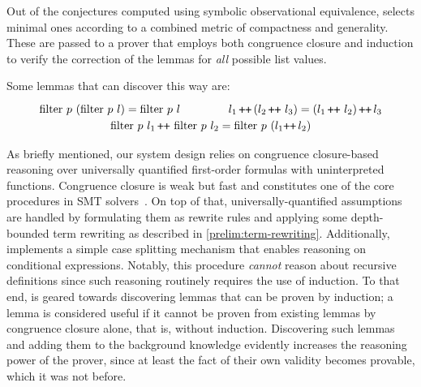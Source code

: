 Out of the conjectures computed using symbolic observational equivalence, \TheSy selects minimal ones according to a combined metric of compactness and generality.
These are passed to a prover that employs both congruence closure and induction to verify the correction of the lemmas for \emph{all} possible list values.

Some lemmas that \TheSy can discover this way are:
\[
\renewcommand\arraystretch{1.2}
\begin{array}{c}
\tfilter~p~(\tfilter~p~l) = \tfilter~p~l
 \hspace{1.5cm}
l_1 \,{\concat}\, (l_2 \,{\concat}~ l_3) = (l_1 \,{\concat}~ l_2) \,{\concat}\, l_3 \\
\tfilter~p~l_1 \concat \,\tfilter~p~l_2 =
\tfilter~p~(l_1{\concat}\,l_2)
\end{array}
\]

As briefly mentioned, our system design relies on congruence closure-based reasoning over universally quantified first-order formulas with uninterpreted functions.
Congruence closure is weak but fast and constitutes one of the core procedures in SMT solvers~\cite{JACM1980:Nelson,IC2007:Nieuwenhuis}.
On top of that, universally-quantified assumptions~\cite{TACAS2017:Barbosa} are handled by formulating them as rewrite rules and applying some depth-bounded term rewriting as described in \autoref{prelim:term-rewriting}.
Additionally, \TheSy implements a simple case splitting mechanism that enables reasoning on conditional expressions.
Notably, this procedure \emph{cannot} reason about recursive definitions since such reasoning routinely requires the use of induction.
To that end, \TheSy is geared towards discovering lemmas that can be proven by induction; a lemma is considered useful if it cannot be proven from existing lemmas by congruence closure alone, that is, without induction.
Discovering such lemmas and adding them to the background knowledge evidently increases the reasoning power of the prover, since at least the fact of their own validity becomes provable, which it was not before.
